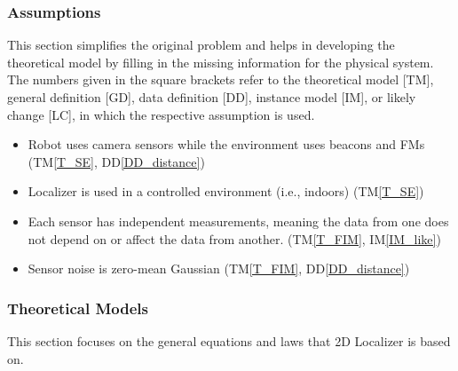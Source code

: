 \documentclass[12pt]{article}
\newcommand{\ddref}[1]{DD\ref{#1}}
\newcommand{\tref}[1]{TM\ref{#1}}
\newcounter{assumpnum} %
\newcommand{\iref}[1]{IM\ref{#1}}
\begin{document}
\subsubsection{Assumptions}\label{sec_assumpt}


This section simplifies the original problem and helps in developing the
theoretical model by filling in the missing information for the physical system.
The numbers given in the square brackets refer to the theoretical model [TM],
general definition [GD], data definition [DD], instance model [IM], or likely
change [LC], in which the respective assumption is used.

\begin{itemize}

\item[A\refstepcounter{assumpnum}1 \label{A_sensors}:]Robot uses camera sensors while the environment uses beacons and FMs (\tref{T_SE}, \ddref{DD_distance})
\item[A\refstepcounter{assumpnum}2 \label{A_controlled}:]Localizer is used in a controlled environment (i.e., indoors) (\tref{T_SE})
\item[A\refstepcounter{assumpnum}3 \label{A_indep}:]Each sensor has independent measurements, meaning the data from one does not depend on or affect the data from another. (\tref{T_FIM}, \iref{IM_like})
\item[A\refstepcounter{assumpnum}4 \label{A_noise}:]Sensor noise is zero-mean Gaussian (\tref{T_FIM}, \ddref{DD_distance})


\end{itemize}

\subsubsection{Theoretical Models}\label{sec_theoretical}

This section focuses on the general equations and laws that 2D Localizer is based
on.
\end{document}
